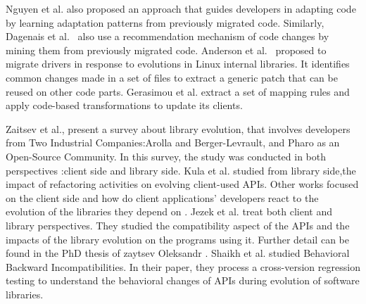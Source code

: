  Nguyen et al. \cite{nguyen2010graph} also proposed an approach that guides developers in adapting code by learning adaptation patterns from previously migrated code. Similarly, Dagenais et al.~\cite{dagenais2011recommending,5070565,10.1145/1932682.1869486} also use a recommendation mechanism of code changes by mining them from previously migrated code. 
 Anderson et al.~\cite{andersen2010generic} proposed to migrate drivers in response to evolutions in Linux internal libraries. It identifies common changes made in a set of files to extract a generic patch that can be reused on other code parts. Gerasimou et al. \cite{10.1145/3194793.3194798} extract a set of mapping rules and apply code-based transformations to update its clients.
 
 
 Zaitsev et al.\cite{10043250}, present a survey about library evolution, that involves developers from Two Industrial Companies:Arolla and Berger-Levrault, and Pharo as an Open-Source Community. In this survey, the study was conducted in both perspectives :client side and library side. Kula et al. \cite{10.1016/j.infsof.2017.09.007} studied from library side,the impact of refactoring activities on evolving client-used APIs.
 Other works focused on the client side and how do client applications' developers react to the evolution of the libraries they depend on \cite{10.1145/2393596.2393662,7332471,7816485,7884616,10.1007/s11219-016-9344-4,10.1007/s10664-017-9521-5}. Jezek et al. \cite{10.1016/j.infsof.2015.02.014} treat both client and library perspectives. They studied the compatibility aspect of the APIs and the impacts of the library evolution on the programs using it. Further detail can be found in the PhD thesis of zaytsev Oleksandr \cite{zaytsev:tel-03998632}. Shaikh et al. \cite{10.1145/3092703.3092721} studied Behavioral Backward Incompatibilities. In their paper, they process a cross-version regression testing to understand the behavioral changes of APIs during evolution of software libraries.

 
% 
 
